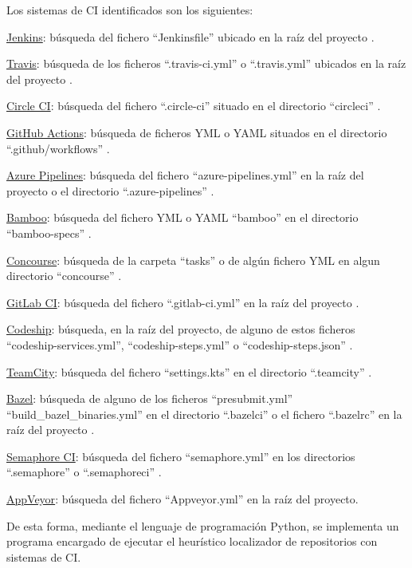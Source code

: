 Los sistemas de CI identificados son los siguientes:
\begin{compactitem}
    \item \underline{Jenkins}: búsqueda del fichero ``Jenkinsfile'' ubicado en la raíz del proyecto \cite{jenkins}.
    \item \underline{Travis}: búsqueda de los ficheros ``.travis-ci.yml'' o ``.travis.yml'' ubicados en la raíz del proyecto \cite{travisCI}.
    \item \underline{Circle CI}: búsqueda del fichero ``.circle-ci'' situado en el directorio ``circleci'' \cite{circleCI}.
    \item \underline{GitHub Actions}: búsqueda de ficheros YML o YAML situados en el directorio ``.github/workflows'' \cite{githubActions}.
    \item \underline{Azure Pipelines}: búsqueda del fichero ``azure-pipelines.yml'' en la raíz del proyecto o el directorio ``.azure-pipelines'' \cite{azurePipelines}.
    \item \underline{Bamboo}: búsqueda del fichero YML o YAML ``bamboo'' en el directorio ``bamboo-specs'' \cite{bamboo}.
    \item \underline{Concourse}: búsqueda de la carpeta ``tasks'' o de algún fichero YML en algun directorio ``concourse'' \cite{concourse}.
    \item \underline{GitLab CI}: búsqueda del fichero ``.gitlab-ci.yml'' en la raíz del proyecto \cite{gitlabCI}.
    \item \underline{Codeship}: búsqueda, en la raíz del proyecto, de alguno de estos ficheros ``codeship-services.yml'', ``codeship-steps.yml'' o ``codeship-steps.json'' \cite{codeship}.
    \item \underline{TeamCity}: búsqueda del fichero ``settings.kts'' en el directorio ``.teamcity'' \cite{teamcity}.
    \item \underline{Bazel}: búsqueda de alguno de los ficheros ``presubmit.yml'' ``build\_bazel\_binaries.yml'' en el directorio ``.bazelci'' o el fichero ``.bazelrc'' en la raíz del proyecto \cite{bazel}.
    \item \underline{Semaphore CI}: búsqueda del fichero ``semaphore.yml'' en los directorios ``.semaphore'' o ``.semaphoreci'' \cite{semaphoreCI}.
    \item \underline{AppVeyor}: búsqueda del fichero ``Appveyor.yml'' en la raíz del proyecto.
\end{compactitem}
	
De esta forma, mediante el lenguaje de programación Python, se implementa un programa encargado de ejecutar el heurístico localizador de repositorios con sistemas de CI.

